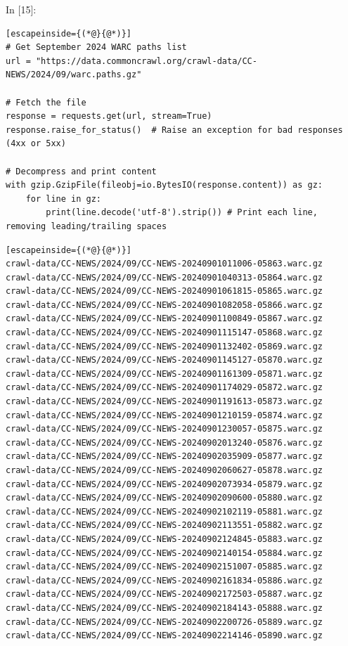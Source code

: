 In {[}15{]}:

\begin{lstlisting}[escapeinside={(*@}{@*)}]
# Get September 2024 WARC paths list
url = "https://data.commoncrawl.org/crawl-data/CC-NEWS/2024/09/warc.paths.gz"

# Fetch the file
response = requests.get(url, stream=True)
response.raise_for_status()  # Raise an exception for bad responses (4xx or 5xx)

# Decompress and print content
with gzip.GzipFile(fileobj=io.BytesIO(response.content)) as gz:
    for line in gz:
        print(line.decode('utf-8').strip()) # Print each line, removing leading/trailing spaces
\end{lstlisting}

\begin{lstlisting}[escapeinside={(*@}{@*)}]
crawl-data/CC-NEWS/2024/09/CC-NEWS-20240901011006-05863.warc.gz
crawl-data/CC-NEWS/2024/09/CC-NEWS-20240901040313-05864.warc.gz
crawl-data/CC-NEWS/2024/09/CC-NEWS-20240901061815-05865.warc.gz
crawl-data/CC-NEWS/2024/09/CC-NEWS-20240901082058-05866.warc.gz
crawl-data/CC-NEWS/2024/09/CC-NEWS-20240901100849-05867.warc.gz
crawl-data/CC-NEWS/2024/09/CC-NEWS-20240901115147-05868.warc.gz
crawl-data/CC-NEWS/2024/09/CC-NEWS-20240901132402-05869.warc.gz
crawl-data/CC-NEWS/2024/09/CC-NEWS-20240901145127-05870.warc.gz
crawl-data/CC-NEWS/2024/09/CC-NEWS-20240901161309-05871.warc.gz
crawl-data/CC-NEWS/2024/09/CC-NEWS-20240901174029-05872.warc.gz
crawl-data/CC-NEWS/2024/09/CC-NEWS-20240901191613-05873.warc.gz
crawl-data/CC-NEWS/2024/09/CC-NEWS-20240901210159-05874.warc.gz
crawl-data/CC-NEWS/2024/09/CC-NEWS-20240901230057-05875.warc.gz
crawl-data/CC-NEWS/2024/09/CC-NEWS-20240902013240-05876.warc.gz
crawl-data/CC-NEWS/2024/09/CC-NEWS-20240902035909-05877.warc.gz
crawl-data/CC-NEWS/2024/09/CC-NEWS-20240902060627-05878.warc.gz
crawl-data/CC-NEWS/2024/09/CC-NEWS-20240902073934-05879.warc.gz
crawl-data/CC-NEWS/2024/09/CC-NEWS-20240902090600-05880.warc.gz
crawl-data/CC-NEWS/2024/09/CC-NEWS-20240902102119-05881.warc.gz
crawl-data/CC-NEWS/2024/09/CC-NEWS-20240902113551-05882.warc.gz
crawl-data/CC-NEWS/2024/09/CC-NEWS-20240902124845-05883.warc.gz
crawl-data/CC-NEWS/2024/09/CC-NEWS-20240902140154-05884.warc.gz
crawl-data/CC-NEWS/2024/09/CC-NEWS-20240902151007-05885.warc.gz
crawl-data/CC-NEWS/2024/09/CC-NEWS-20240902161834-05886.warc.gz
crawl-data/CC-NEWS/2024/09/CC-NEWS-20240902172503-05887.warc.gz
crawl-data/CC-NEWS/2024/09/CC-NEWS-20240902184143-05888.warc.gz
crawl-data/CC-NEWS/2024/09/CC-NEWS-20240902200726-05889.warc.gz
crawl-data/CC-NEWS/2024/09/CC-NEWS-20240902214146-05890.warc.gz

\end{lstlisting}
